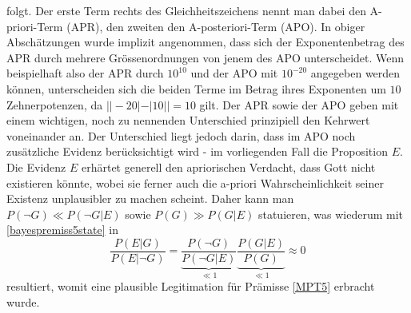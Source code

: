 \documentclass[a4paper,11pt]{article}
\numberwithin{equation}{section}
\begin{document}
\begin{equation}
\end{equation} folgt. Der erste Term rechts des Gleichheitszeichens nennt man dabei den A-priori-Term (APR), den zweiten den A-posteriori-Term (APO). In obiger Abschätzungen wurde implizit angenommen, dass sich der Exponentenbetrag des APR durch mehrere Grössenordnungen von jenem des APO unterscheidet. Wenn beispielhaft also der APR durch $10^{10}$ und der APO mit $10^{-20}$ angegeben werden können, unterscheiden sich die beiden Terme im Betrag ihres Exponenten um $10$ Zehnerpotenzen, da $||-20|-|10||=10$ gilt. Der APR sowie der APO geben mit einem wichtigen, noch zu nennenden Unterschied prinzipiell den Kehrwert voneinander an. Der Unterschied liegt jedoch darin, dass im APO noch zusätzliche Evidenz berücksichtigt wird - im vorliegenden Fall die Proposition $E$. Die Evidenz $E$ erhärtet generell den apriorischen Verdacht, dass Gott nicht existieren könnte, wobei sie ferner auch die a-priori Wahrscheinlichkeit seiner Existenz unplausibler zu machen scheint. Daher kann man $P(\neg G) \ll P(\neg G|E)$ sowie $P(G) \gg P(G|E)$ statuieren, was wiederum mit \eqref{bayespremiss5state} in \begin{equation}
\frac{P(E|G)}{P(E|\neg G)}=\underbrace{\frac{P(\neg G)}{P(\neg G|E)}}_{\ll 1}\underbrace{\frac{P(G|E)}{P(G)}}_{\ll 1} \approx 0
\end{equation} resultiert, womit eine plausible Legitimation für Prämisse \ref{MPT5} erbracht wurde.

\end{document}
